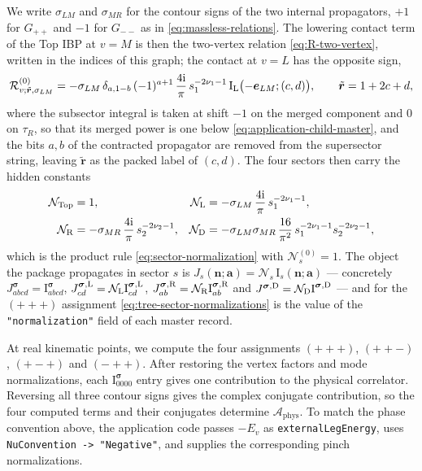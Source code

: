 \documentclass[11pt,a4paper]{article}
\numberwithin{table}{section}
\newcommand{\ii}{\mathrm i}
\newcommand{\cR}{\mathcal R}
\newcommand{\cN}{\mathcal N}
\begin{document}
We write $\sigma_{LM}$ and $\sigma_{MR}$ for the contour signs of the two internal propagators,
$+1$ for $G_{++}$ and $-1$ for $G_{--}$ as in \eqref{eq:massless-relations}. The lowering contact
term of the Top IBP at $v=M$ is then the two-vertex relation \eqref{eq:R-two-vertex},
written in the indices of this graph; the contact at $v=L$ has the opposite sign,
\begin{equation}
  \cR^{(0)}_{v;\tilde{\bm r},\sigma_{LM}}
  =-\sigma_{LM}\,\delta_{a,1-b}\,(-1)^{a+1}\,\frac{4\ii}{\pi}\,s_1^{-2\nu_1-1}\,
   \text{I}_{\rm L}\bigl(-\bm e_{LM};(c,d)\bigr),
  \qquad \tilde{\bm r}=1+2c+d,
  \label{eq:tree-contact-term}
\end{equation}
where the subsector integral is taken at shift $-1$ on the merged component and $0$ on $\tau_R$, so that its
merged power is one below \eqref{eq:application-child-master}, and the bits $a,b$ of the contracted
propagator are removed from the supersector string, leaving $\tilde{\bm r}$ as the packed label of $(c,d)$.
The four sectors then carry the hidden constants
\begin{equation}
  \begin{aligned}
  \cN_{\rm Top}&=1, & \cN_{\rm L}&=-\sigma_{LM}\,\frac{4\ii}{\pi}\,s_1^{-2\nu_1-1},\\
  \cN_{\rm R}&=-\sigma_{MR}\,\frac{4\ii}{\pi}\,s_2^{-2\nu_2-1}, &
  \cN_{\rm D}&=-\sigma_{LM}\sigma_{MR}\,\frac{16}{\pi^2}\,s_1^{-2\nu_1-1}s_2^{-2\nu_2-1},
  \end{aligned}
  \label{eq:tree-sector-normalizations}
\end{equation}
which is the product rule \eqref{eq:sector-normalization} with $\cN_s^{(0)}=1$. The object the
package propagates in sector $s$ is $J_s(\bm n;\bm a)=\cN_s\,\text{I}_s(\bm n;\bm a)$ ---
concretely $J^{\boldsymbol\sigma}_{abcd}=\text{I}^{\boldsymbol\sigma}_{abcd}$,
$J^{\boldsymbol\sigma,{\rm L}}_{cd}=\cN_{\rm L}\text{I}^{\boldsymbol\sigma,{\rm L}}_{cd}$,
$J^{\boldsymbol\sigma,{\rm R}}_{ab}=\cN_{\rm R}\text{I}^{\boldsymbol\sigma,{\rm R}}_{ab}$ and
$J^{\boldsymbol\sigma,{\rm D}}=\cN_{\rm D}\text{I}^{\boldsymbol\sigma,{\rm D}}$ --- and for the
$(+++)$ assignment \eqref{eq:tree-sector-normalizations} is the value of the
\texttt{"normalization"} field of each master record.

At real kinematic points, we compute the four assignments
$(+++)$, $(++-)$, $(+-+)$ and $(-++)$.
After restoring the vertex factors and mode normalizations, each
$\text{I}^{\boldsymbol\sigma}_{0000}$ entry gives one contribution to the physical correlator.
Reversing all three contour signs gives the complex conjugate contribution, so the four computed
terms and their conjugates determine $\mathcal A_{\mathrm{phys}}$.
To match the phase convention above, the application code passes $-E_v$ as \texttt{externalLegEnergy}, uses \texttt{NuConvention -> "Negative"}, and supplies the corresponding pinch normalizations.
\end{document}
